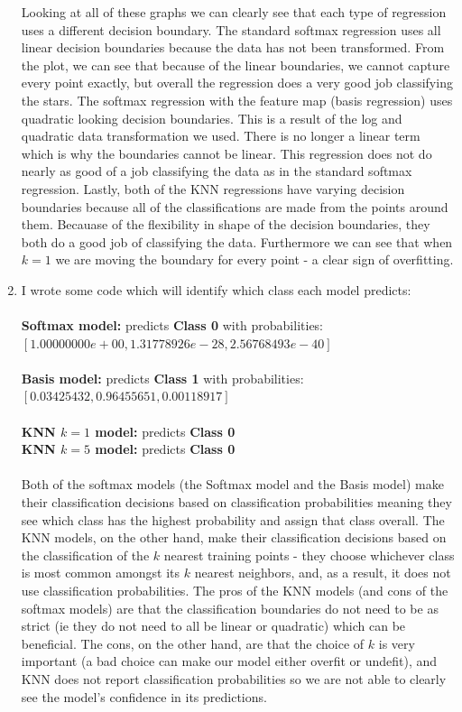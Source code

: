 \documentclass[submit]{harvardml}
\begin{document}
\begin{enumerate}
     Looking at all of these graphs we can clearly see that each type of regression uses a different decision boundary. The standard softmax regression uses all linear decision boundaries because the data has not been transformed. From the plot, we can see that because of the linear boundaries, we cannot capture every point exactly, but overall the regression does a very good job classifying the stars. The softmax regression with the feature map (basis regression) uses quadratic looking decision boundaries. This is a result of the log and quadratic data transformation we used. There is no longer a linear term which is why the boundaries cannot be linear. This regression does not do nearly as good of a job classifying the data as in the standard softmax regression. Lastly, both of the KNN regressions have varying decision boundaries because all of the classifications are made from the points around them. Becauase of the flexibility in shape of the decision boundaries, they both do a good job of classifying the data. Furthermore we can see that when $k=1$ we are moving the boundary for every point - a clear sign of overfitting. \\
     \item
     I wrote some code which will identify which class each model predicts:\\
     \\
     \textbf{Softmax model:} predicts \textbf{Class 0} with probabilities: \\$[1.00000000e+00, 1.31778926e-28, 2.56768493e-40]$\\
     \\
     \textbf{Basis model:} predicts \textbf{Class 1} with probabilities:\\ $[0.03425432, 0.96455651, 0.00118917]$\\
     \\
     \textbf{KNN $k=1$ model:} predicts \textbf{Class 0}\\
     \textbf{KNN $k=5$ model:} predicts \textbf{Class 0}\\
     \\
     Both of the softmax models (the Softmax model and the Basis model) make their classification decisions based on classification probabilities meaning they see which class has the highest probability and assign that class overall. The KNN models, on the other hand, make their classification decisions based on the classification of the $k$ nearest training points - they choose whichever class is most common amongst its $k$ nearest neighbors, and, as a result, it does not use classification probabilities. The pros of the KNN models (and cons of the softmax models) are that the classification boundaries do not need to be as strict (ie they do not need to all be linear or quadratic) which can be beneficial. The cons, on the other hand, are that the choice of $k$ is very important (a bad choice can make our model either overfit or undefit), and KNN does not report classification probabilities so we are not able to clearly see the model's confidence in its predictions. \\

\end{enumerate}
\end{document}
